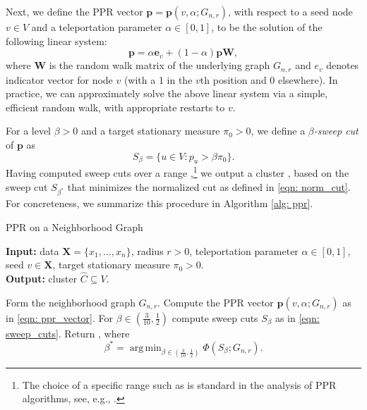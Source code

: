 \documentclass{article}
\newcommand{\1}{\mathbf{1}}
\newcommand{\pbf}{\mathbf{p}}
\newcommand{\ebf}[1]{\mathbf{e}_{#1}}
\newcommand{\Xbf}{\mathbf{X}}
\newcommand{\Wbf}{\mathbf{W}}
\DeclareMathOperator*{\argmin}{arg\,min}
\theoremstyle{aldenthm}
\theoremstyle{aldenrmrk}
\begin{document}
Next, we define the PPR vector $\pbf = \pbf(v,\alpha;G_{n,r})$, with respect to  
a seed node $v \in V$ and a teleportation parameter $\alpha \in [0,1]$, to be
the solution of the following linear system:
\begin{equation}
\label{eqn: ppr_vector}
\pbf = \alpha \ebf{v} + (1 - \alpha) \pbf \Wbf,
\end{equation}
where $\Wbf$ is the random walk matrix of the underlying graph $G_{n,r}$ 
and $e_{v}$ denotes indicator vector for node $v$ (with a 1 in the $v$th
position and 0 elsewhere).  In practice, we can approximately solve the above
linear system via a simple, efficient random walk, with appropriate restarts to
$v$. 

For a level $\beta > 0$ and a target stationary measure $\pi_0 > 0$, we define a
\emph{$\beta$-sweep cut} of $\pbf$ as  
\begin{equation}
\label{eqn: sweep_cuts}
S_\beta = \{u \in V: p_u > \beta \pi_{0}\}.
\end{equation}
Having computed sweep cuts over a range ,\footnote{The choice of a specific range such as 
 is standard in the analysis of PPR
algorithms, see, e.g., \citep{zhu2013}.}
we output a cluster , based on the sweep cut
$S_{\beta^*}$ that minimizes the normalized cut  as defined in \eqref{eqn: norm_cut}. For concreteness, we summarize
this procedure in Algorithm \ref{alg: ppr}.   

\begin{algorithm}
\caption{PPR on a Neighborhood Graph}
\label{alg: ppr}	
{\bfseries Input:} data $\Xbf=\{x_1,\ldots,x_n\}$, radius $r > 0$, teleportation 
parameter $\alpha \in [0,1]$, seed $v \in \Xbf$, target stationary measure $\pi_0 >
0$. \\   
{\bfseries Output:} cluster $\widehat{C} \subseteq V$.
\begin{algorithmic}[1]
  \STATE Form the neighborhood graph $G_{n,r}$.
  \STATE Compute the PPR vector $\pbf(v, \alpha; G_{n,r})$ as in \eqref{eqn:
    ppr_vector}. 
  \STATE For $\beta \in (\frac{3}{10}, \frac{1}{2})$ compute sweep cuts
  $S_{\beta}$ as in \eqref{eqn: sweep_cuts}.
  \STATE Return , where 
  $$
  \beta^* = \argmin_{\beta \in (\frac{3}{10}, \frac{1}{2})} \Phi(S_{\beta}; G_{n,r}).
  $$
\end{algorithmic}
\end{algorithm}
\end{document}
